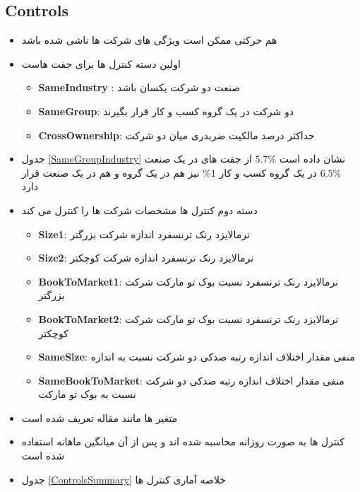 \documentclass[12pt, a4paper]{article}
\begin{document}
\FloatBarrier


\subsection{Controls}

\begin{itemize}
	\item 
	هم حرکتی ممکن است ویژگی های شرکت ها ناشی شده باشد
	
	\item 
	اولین دسته کنترل ها برای جفت هاست
	\begin{itemize}
\item 
\textbf{SameIndustry} :
صنعت دو شرکت یکسان باشد
\item 
\textbf{SameGroup}:
دو شرکت در یک گروه کسب و کار قرار بگیرند
\item 
\textbf{CrossOwnership}:
حداکثر درصد مالکیت ضربدری میان دو شرکت
		
	\end{itemize}
	\item 
	جدول
	\ref{SameGroupIndustry}
	نشان داده است $5.7 \%$ از جفت های در یک صنعت
	$6.5 \%$ در یک گروه کسب و کار
	1\% نیز هم در یک گروه و هم در یک صنعت قرار دارد
	\item 
دسته دوم کنترل ها مشخصات شرکت ها را کنترل می کند
\begin{itemize}
	\item \textbf{Size1}:
	نرمالایزد رنک ترنسفرد اندازه شرکت بزرگتر
	
	
	\item \textbf{Size2}:
	نرمالایزد رنک ترنسفرد اندازه شرکت کوچکتر
	
	\item \textbf{BookToMarket1}:
	نرمالایزد رنک ترنسفرد نسبت بوک تو مارکت شرکت بزرگتر
	
	\item \textbf{BookToMarket2}:
		نرمالایزد رنک ترنسفرد نسبت بوک تو مارکت شرکت کوچکتر
	\item \textbf{SameSize}:
	منفی مقدار اختلاف اندازه رتبه صدکی دو شرکت نسبت به اندازه
	\item  \textbf{SameBookToMarket}:
	منفی مقدار اختلاف اندازه رتبه صدکی دو شرکت نسبت به بوک تو مارکت
\end{itemize}
	\item 
	متغیر ها مانند مقاله
	تعریف شده است
	\item
کنترل ها به صورت روزانه محاسبه شده اند و پس از آن میانگین ماهانه استفاده شده است
\item 
جدول 
\ref{ControlsSummary}
خلاصه آماری کنترل ها
\end{itemize}
\end{document}
